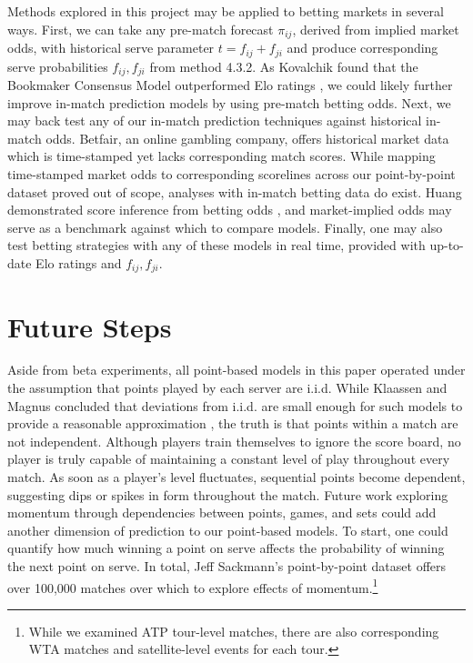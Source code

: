 \documentclass[chapterprefix=false]{report}
\begin{document}
Methods explored in this project may be applied to betting markets in several ways. First, we can take any pre-match forecast $\pi_{ij}$, derived from implied market odds, with historical serve parameter $t = f_{ij} + f_{ji}$  and produce corresponding serve probabilities $f_{ij},f_{ji}$ from method 4.3.2. As Kovalchik found that the Bookmaker Consensus Model outperformed Elo ratings \citep{Kovalchik2016}, we could likely further improve in-match prediction models by using pre-match betting odds. Next, we may back test any of our in-match prediction techniques against historical in-match odds. Betfair, an online gambling company, offers historical market data which is time-stamped yet lacks corresponding match scores. While mapping time-stamped market odds to corresponding scorelines across our point-by-point dataset proved out of scope, analyses with in-match betting data do exist. Huang demonstrated score inference from betting odds \citep{Huang2011}, and market-implied odds may serve as a benchmark against which to compare models. Finally, one may also test betting strategies with any of these models in real time, provided with up-to-date Elo ratings and $f_{ij},f_{ji}$.



\section{Future Steps}

Aside from beta experiments, all point-based models in this paper operated under the assumption that points played by each server are i.i.d. While Klaassen and Magnus concluded that deviations from i.i.d. are small enough for such models to provide a reasonable approximation \citep{KlaassenandMagnus2001}, the truth is that points within a match are not independent. Although players train themselves to ignore the score board, no player is truly capable of maintaining a constant level of play throughout every match. As soon as a player's level fluctuates, sequential points become dependent, suggesting dips or spikes in form throughout the match. Future work exploring momentum through dependencies between points, games, and sets could add another dimension of prediction to our point-based models. To start, one could quantify how much winning a point on serve affects the probability of winning the next point on serve. In total, Jeff Sackmann's point-by-point dataset offers over 100,000 matches over which to explore effects of momentum.\footnote{While we examined ATP tour-level matches, there are also corresponding WTA matches and satellite-level events for each tour.}
\end{document}
